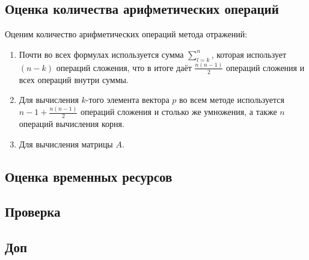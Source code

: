     \subsection{Оценка количества арифметических операций}
        Оценим количество арифметических операций метода отражений:
            \begin{enumerate}
                \item Почти во всех формулах используется сумма $\sum_{l=k}^{n}$, которая использует $(n-k)$ операций сложения, что в итоге даёт $\frac{n(n-1)}{2}$ операций сложения и всех операций внутри суммы.
                \item Для вычисления $k$-того элемента вектора $p$ во всем методе используется $n-1 + \frac{n(n-1)}{2}$ операций сложения и столько же умножения, а также $ n $ операций вычисления корня.
                \item Для вычисления матрицы $A$. 
            \end{enumerate}


    \subsection{Оценка временных ресурсов}


    \subsection{Проверка}


    \subsection{Доп}




